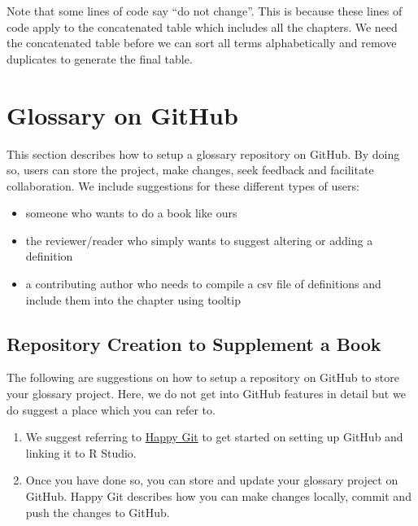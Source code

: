 \documentclass[
]{book}
\providecommand{\tightlist}{%
  \setlength{\itemsep}{0pt}\setlength{\parskip}{0pt}}
\begin{document}
Note that some lines of code say ``do not change''. This is because these lines of code apply to the concatenated table which includes all the chapters. We need the concatenated table before we can sort all terms alphabetically and remove duplicates to generate the final table.

\hypertarget{glossary-on-github}{%
\section{Glossary on GitHub}\label{glossary-on-github}}

This section describes how to setup a glossary repository on GitHub. By doing so, users can store the project, make changes, seek feedback and facilitate collaboration. We include suggestions for these different types of users:

\begin{itemize}
\tightlist
\item
  someone who wants to do a book like ours
\item
  the reviewer/reader who simply wants to suggest altering or adding a definition
\item
  a contributing author who needs to compile a csv file of definitions and include them into the chapter using tooltip
\end{itemize}

\hypertarget{repository-creation-to-supplement-a-book}{%
\subsection{Repository Creation to Supplement a Book}\label{repository-creation-to-supplement-a-book}}

The following are suggestions on how to setup a repository on GitHub to store your glossary project. Here, we do not get into GitHub features in detail but we do suggest a place which you can refer to.

\begin{enumerate}
\def\labelenumi{\arabic{enumi}.}
\tightlist
\item
  We suggest referring to \href{http://happygitwithr.com/rstudio-git-github.html}{Happy Git} to get started on setting up GitHub and linking it to R Studio.
\item
  Once you have done so, you can store and update your glossary project on GitHub. Happy Git describes how you can make changes locally, commit and push the changes to GitHub.
\end{enumerate}
\end{document}
